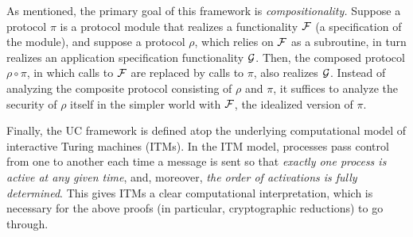 As mentioned, the primary goal of this framework is
\emph{compositionality.}
Suppose a protocol $\pi$ is a protocol module that realizes a functionality $\mathcal{{F}}$ (a specification of the module),
and suppose a protocol $\rho$, which relies on $\mathcal{{F}}$ as a subroutine, in turn realizes an application specification functionality $\mathcal{{G}}$.
Then, the composed protocol $\rho \circ \pi$, in which calls to
$\mathcal{{F}}$ are replaced by calls to $\pi$, also realizes $\mathcal{{G}}$.
%
Instead of analyzing the composite protocol consisting of $\rho$ and $\pi$,
it suffices to analyze the security of $\rho$ itself in the simpler
world with $\mathcal{{F}}$, the idealized version of $\pi$.

Finally, the UC framework is defined atop the underlying computational model of
interactive Turing machines (ITMs). In the ITM model, processes pass control
from one to another each time a message is sent so that \emph{exactly one
  process is active at any given time}, and, moreover, \emph{the order of
  activations is fully determined}. This gives ITMs a clear computational
interpretation, which is necessary for the above proofs (in particular,
cryptographic reductions) to go through.

